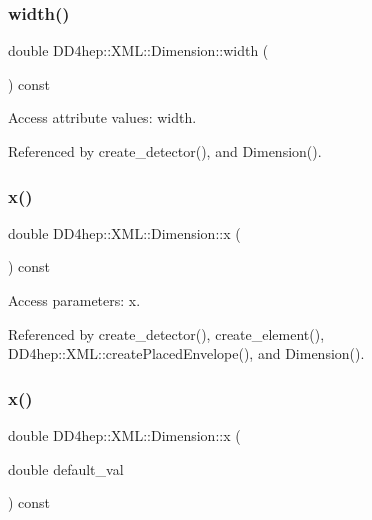 \subsubsection{\texorpdfstring{width()}{width()}}
{\footnotesize\ttfamily double D\+D4hep\+::\+X\+M\+L\+::\+Dimension\+::width (\begin{DoxyParamCaption}{ }\end{DoxyParamCaption}) const}



Access attribute values\+: width. 



Referenced by create\+\_\+detector(), and Dimension().

\hypertarget{struct_d_d4hep_1_1_x_m_l_1_1_dimension_ac99400d153381882b85481a83541d82a}{}\label{struct_d_d4hep_1_1_x_m_l_1_1_dimension_ac99400d153381882b85481a83541d82a} 
\subsubsection{\texorpdfstring{x()}{x()}\hspace{0.1cm}{\footnotesize\ttfamily [1/2]}}
{\footnotesize\ttfamily double D\+D4hep\+::\+X\+M\+L\+::\+Dimension\+::x (\begin{DoxyParamCaption}{ }\end{DoxyParamCaption}) const}



Access parameters\+: x. 



Referenced by create\+\_\+detector(), create\+\_\+element(), D\+D4hep\+::\+X\+M\+L\+::create\+Placed\+Envelope(), and Dimension().

\hypertarget{struct_d_d4hep_1_1_x_m_l_1_1_dimension_a767cd7d05e0c329f23cd1023dce16dd2}{}\label{struct_d_d4hep_1_1_x_m_l_1_1_dimension_a767cd7d05e0c329f23cd1023dce16dd2} 
\subsubsection{\texorpdfstring{x()}{x()}\hspace{0.1cm}{\footnotesize\ttfamily [2/2]}}
{\footnotesize\ttfamily double D\+D4hep\+::\+X\+M\+L\+::\+Dimension\+::x (\begin{DoxyParamCaption}\item[{double}]{default\+\_\+val }\end{DoxyParamCaption}) const}



